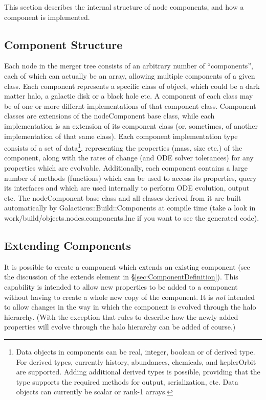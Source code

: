 This section describes the internal structure of node components, and how a component is implemented.

\subsection{Component Structure}

Each node in the merger tree consists of an arbitrary number of ``components'', each of which can actually be an array, allowing multiple components of a given class. Each component represents a specific class of object, which could be a dark matter halo, a galactic disk or a black hole etc. A component of each class may be of one or more differnt implementations of that component class. Component classes are extensions of the {\normalfont \ttfamily nodeComponent} base class, while each implementation is an extension of its component class (or, sometimes, of another implementation of that same class). Each component implementation type consists of a set of data\footnote{Data objects in components can be real, integer, boolean or of derived type. For derived types, currently {\normalfont \ttfamily history}, {\normalfont \ttfamily abundances}, {\normalfont \ttfamily chemicals}, and {\normalfont \ttfamily keplerOrbit} are supported. Adding additional derived types is possible, providing that the type supports the required methods for output, serialization, etc. Data objects can currently be scalar or rank-1 arrays.}, representing the properties (mass, size etc.) of the component, along with the rates of change (and ODE solver tolerances) for any properties which are evolvable. Additionally, each component contains a large number of methods (functions) which can be used to access its properties, query its interfaces and which are used internally to perform ODE evolution, output etc. The {\normalfont \ttfamily nodeComponent} base class and all classes derived from it are built automatically by {\normalfont \ttfamily Galacticus::Build::Components} at compile time (take a look in {\normalfont \ttfamily work/build/objects.nodes.components.Inc} if you want to see the generated code).

\subsection{Extending Components}

It is possible to create a component which extends an existing component (see the discussion of the {\normalfont \ttfamily extends} element in \S\ref{sec:ComponentDefinition}). This capability is intended to allow new properties to be added to a component without having to create a whole new copy of the component. It is \emph{not} intended to allow changes in the way in which the component is evolved through the halo hierarchy. (With the exception that rules to describe how the newly added properties will evolve through the halo hierarchy can be added of course.)

